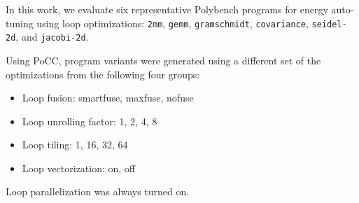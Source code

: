 In this work, we evaluate six representative Polybench programs for energy auto-tuning using
loop optimizations: \texttt{2mm}, \texttt{gemm}, \texttt{gramschmidt}, \texttt{covariance}, \texttt{seidel-2d}, and \texttt{jacobi-2d}.

Using PoCC, program variants were generated using
a different set of the 
optimizations from the following four groups: 
\begin{itemize}
    \item Loop fusion: smartfuse, maxfuse, nofuse
    \item Loop unrolling factor: 1, 2, 4, 8
    \item Loop tiling: 1, 16, 32, 64 %
    \item Loop vectorization: on, off
\end{itemize}
Loop parallelization was always turned on.

